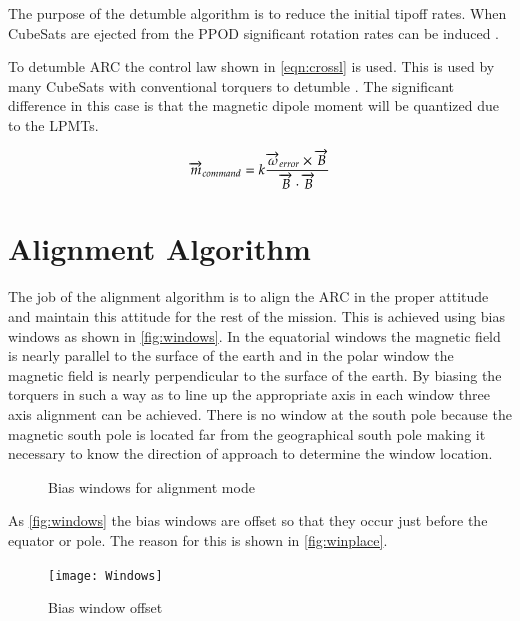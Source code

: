 The purpose of the detumble algorithm is to reduce the initial tipoff rates. When CubeSats are ejected from the \ac{PPOD} significant rotation rates can be induced .

To detumble \ac{ARC} the control law shown in \autoref{eqn:crossl} is used. This is used by many CubeSats with conventional torquers to detumble . The significant difference in this case is that the magnetic dipole moment will be quantized due to the \acp{LPMT}.

\begin{equation}
\overrightarrow{m}_{command} = k {{\overrightarrow{\omega}_{error} \times \overrightarrow{B}} \over{\overrightarrow{B} \cdot \overrightarrow{B}}}
\label{eqn:crossl}
\end{equation}

\section{Alignment Algorithm}

The job of the alignment algorithm is to align the \ac{ARC} in the proper attitude and maintain this attitude for the rest of the mission. This is achieved using bias windows as shown in \autoref{fig:windows}. In the equatorial windows the magnetic field is nearly parallel to the surface of the earth and in the polar window the magnetic field is nearly perpendicular to the surface of the earth. By biasing the torquers in such a way as to line up the appropriate axis in each window three axis alignment can be achieved. There is no window at the south pole because the magnetic south pole is located far from the geographical south pole making it necessary to know the direction of approach to determine the window location.

\begin{figure}[H]
    \centering
    
    \caption{Bias windows for alignment mode}
    \label{fig:windows}
\end{figure}

As \autoref{fig:windows} the bias windows are offset so that they occur just before the equator or pole. The reason for this is shown in \autoref{fig:winplace}.

\begin{figure}[H]
    \centering
    \texttt{[image: Windows]}
    \caption{Bias window offset}
    \label{fig:winplace}
\end{figure}


